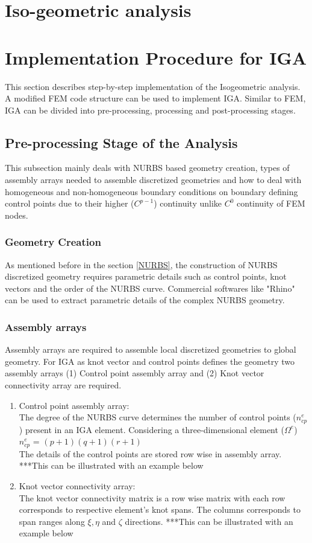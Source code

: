 \documentclass[12pt]{article}
\begin{document}
\section{Iso-geometric analysis}

\section{Implementation Procedure for IGA}
This section describes step-by-step implementation of the Isogeometric analysis. A modified FEM code structure can be used to implement IGA. Similar to FEM, IGA can be divided into pre-processing, processing and post-processing stages. 


\subsection{Pre-processing Stage of the Analysis}
This subsection mainly deals with NURBS based geometry creation, types of assembly arrays needed to assemble discretized geometries and how to deal with homogeneous and non-homogeneous boundary conditions on boundary defining control points due to their higher ($C^{p-1}$) continuity unlike $C^{0}$ continuity of FEM nodes.
\subsubsection{Geometry Creation}
As mentioned before in the section \ref{NURBS}, the construction of NURBS discretized geometry requires parametric details such as control points, knot vectors and the order of the NURBS curve. Commercial softwares like "Rhino" can be used to extract parametric details of the complex NURBS geometry. \\
\subsubsection{Assembly arrays}
Assembly arrays are required to assemble local discretized geometries to global geometry. For IGA as knot vector and control points defines the geometry two assembly arrays (1) Control point assembly array and (2) Knot vector connectivity array are required.
\begin{enumerate}[leftmargin=*]
\item Control point assembly array: \\
The degree of the NURBS curve determines the number of control points ($n^e_{cp}$) present in an IGA element.
Considering a three-dimensional element ($\Omega^e$)\\
$n^e_{cp}$ = $(p+1)(q+1)(r+1)$ \\
The details of the control points are stored row wise in assembly array.
***This can be illustrated with an example below
\item Knot vector connectivity array: \\
The knot vector connectivity matrix is a row wise matrix with each row corresponds to respective element's knot spans. The columns corresponds to span ranges along $\xi, \eta$ and $\zeta$ directions.
***This can be illustrated with an example below
\end{enumerate}
\end{document}
